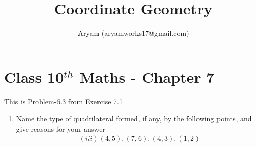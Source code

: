 \documentclass[10pt]{article}
\title{Coordinate Geometry}
\author{Aryam (aryamworks17@gmail.com)}
\begin{document}
\maketitle
\section*{Class 10$^{th}$ Maths - Chapter 7}
This is Problem-6.3 from Exercise 7.1
\begin{enumerate}
\item Name the type of quadrilateral formed, if any, by the following points, and give reasons for your answer\\
\begin{align}
(iii) (4, 5), (7, 6), (4, 3), (1, 2)
\end{align}
\end{enumerate}
\end{document}

